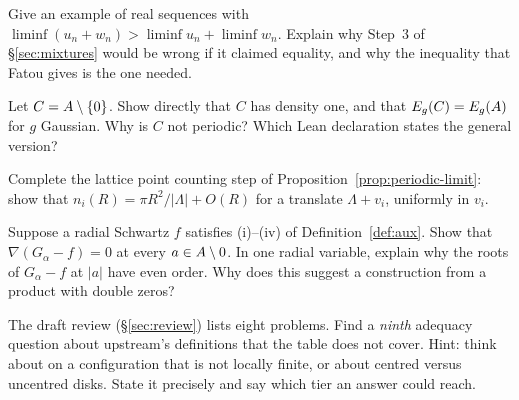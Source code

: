 \begin{exercise}[(M)]
Give an example of real sequences with $\liminf(u_n+w_n)>\liminf u_n+\liminf w_n$. Explain why Step~3 of
\S\ref{sec:mixtures} would be wrong if it claimed equality, and why the inequality that Fatou gives is the one needed.
\end{exercise}

\begin{exercise}[(M)]
Let $C=A\setminus\{0\}$. Show directly that $C$ has density one, and that $E_g(C)=E_g(A)$ for $g$ Gaussian. Why is
$C$ not periodic? Which Lean declaration states the general version?
\end{exercise}

\begin{exercise}[(H)]
Complete the lattice point counting step of Proposition~\ref{prop:periodic-limit}: show that
$n_i(R)=\pi R^2/|\Lambda|+O(R)$ for a translate $\Lambda+v_i$, uniformly in $v_i$.
\end{exercise}

\begin{exercise}[(H)]
Suppose a radial Schwartz $f$ satisfies (i)--(iv) of Definition~\ref{def:aux}. Show that $\nabla(G_\alpha-f)=0$ at every
$a\in A\setminus0$. In one radial variable, explain why the roots of $G_\alpha-f$ at $|a|$ have even order. Why does
this suggest a construction from a product with double zeros?
\end{exercise}

\begin{exercise}[(H)]
The draft review (\S\ref{sec:review}) lists eight problems. Find a \emph{ninth} adequacy question about upstream's
definitions that the table does not cover. Hint: think about  on a configuration that is not locally
finite, or about centred versus uncentred disks. State it precisely and say which tier an answer could reach.
\end{exercise}

